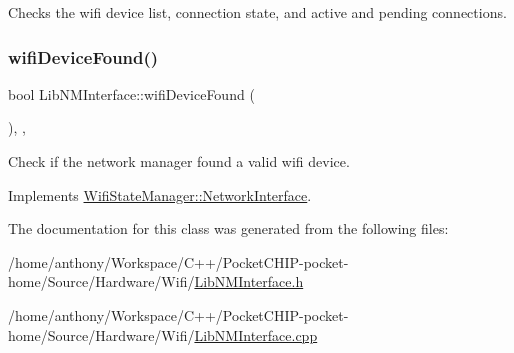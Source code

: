 Checks the wifi device list, connection state, and active and pending connections. \mbox{\label{classLibNMInterface_a78f5de282c47c78e87ffa21ea542475b}} 
\subsubsection{\texorpdfstring{wifi\+Device\+Found()}{wifiDeviceFound()}}
{\footnotesize\ttfamily bool Lib\+N\+M\+Interface\+::wifi\+Device\+Found (\begin{DoxyParamCaption}{ }\end{DoxyParamCaption})\hspace{0.3cm}{\ttfamily [override]}, {\ttfamily [protected]}, {\ttfamily [virtual]}}

Check if the network manager found a valid wifi device. 

Implements \mbox{\hyperlink{classWifiStateManager_1_1NetworkInterface_a0c2675d835715d956315d9e04e2667f9}{Wifi\+State\+Manager\+::\+Network\+Interface}}.



The documentation for this class was generated from the following files\+:\begin{DoxyCompactItemize}
\item 
/home/anthony/\+Workspace/\+C++/\+Pocket\+C\+H\+I\+P-\/pocket-\/home/\+Source/\+Hardware/\+Wifi/\mbox{\hyperlink{LibNMInterface_8h}{Lib\+N\+M\+Interface.\+h}}\item 
/home/anthony/\+Workspace/\+C++/\+Pocket\+C\+H\+I\+P-\/pocket-\/home/\+Source/\+Hardware/\+Wifi/\mbox{\hyperlink{LibNMInterface_8cpp}{Lib\+N\+M\+Interface.\+cpp}}\end{DoxyCompactItemize}
